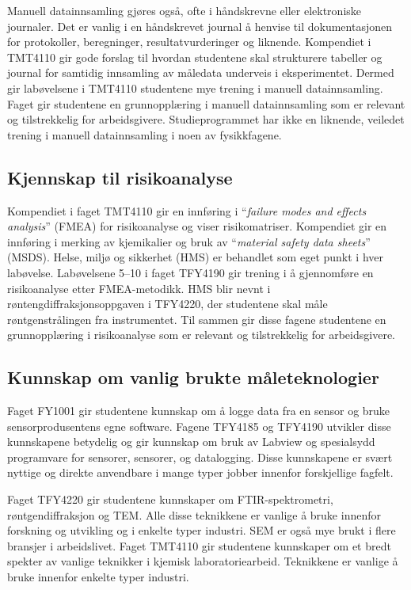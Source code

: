\documentclass{article}
\begin{document}
Manuell datainnsamling gjøres også, ofte i håndskrevne eller elektroniske journaler. Det er vanlig i en håndskrevet journal å henvise til dokumentasjonen for protokoller, beregninger, resultatvurderinger og liknende. Kompendiet i TMT4110 gir gode forslag til hvordan studentene skal strukturere tabeller og journal for samtidig innsamling av måledata underveis i eksperimentet. Dermed gir labøvelsene i TMT4110 studentene mye trening i manuell datainnsamling. Faget gir studentene en grunnopplæring i manuell datainnsamling som er relevant og tilstrekkelig for arbeidsgivere. Studieprogrammet har ikke en liknende, veiledet trening i manuell datainnsamling i noen av fysikkfagene.

\subsection{Kjennskap til risikoanalyse}
Kompendiet i faget TMT4110 gir en innføring i ``\emph{failure modes and effects analysis}'' (FMEA) for risikoanalyse og viser risikomatriser. Kompendiet gir en innføring i merking av kjemikalier og bruk av ``\emph{material safety data sheets}'' (MSDS). Helse, miljø og sikkerhet (HMS) er behandlet som eget punkt i hver labøvelse. Labøvelsene 5--10 i faget TFY4190 gir trening i å gjennomføre en risikoanalyse etter FMEA-metodikk. HMS blir nevnt i røntengdiffraksjonsoppgaven i TFY4220, der studentene skal måle røntgenstrålingen fra instrumentet. Til sammen gir disse fagene studentene en grunnopplæring i risikoanalyse som er relevant og tilstrekkelig for arbeidsgivere.

\subsection{Kunnskap om vanlig brukte måleteknologier}
\label{Teknikker}
Faget FY1001 gir studentene kunnskap om å logge data fra en sensor og bruke sensorprodusentens egne software. Fagene TFY4185 og TFY4190 utvikler disse kunnskapene betydelig og gir kunnskap om bruk av Labview og spesialsydd programvare for sensorer, sensorer, og datalogging. Disse kunnskapene er svært nyttige og direkte anvendbare i mange typer jobber innenfor forskjellige fagfelt.

Faget TFY4220 gir studentene kunnskaper om FTIR-spektrometri, røntgendiffraksjon og TEM. Alle disse teknikkene er vanlige å bruke innenfor forskning og utvikling og i enkelte typer industri. SEM er også mye brukt i flere bransjer i arbeidslivet. Faget TMT4110 gir studentene kunnskaper om et bredt spekter av vanlige teknikker i kjemisk laboratoriearbeid. Teknikkene er vanlige å bruke innenfor enkelte typer industri.
\end{document}
